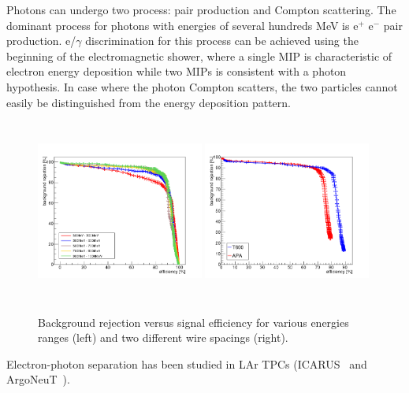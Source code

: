 Photons can undergo two process: pair production and Compton scattering. 
The dominant process for photons with energies of several hundreds MeV is 
e$^+$ e$^-$ pair production.
e/$\gamma$ discrimination
for this process can be achieved using the beginning of the electromagnetic shower, where 
a single MIP is characteristic of electron energy deposition while two MIPs is consistent 
with a photon hypothesis.
In case where the photon Compton scatters, the two particles cannot easily be distinguished
from the energy deposition pattern.


\begin{figure}[h!]
  \centering
\includegraphics[width=0.49\textwidth,height=6.0cm]{figures/eff-bgdrej-diffen}
\includegraphics[width=0.49\textwidth,height=6.0cm]{figures/APAT600_all_norm}
  \caption{Background rejection versus signal efficiency for various energies ranges (left) and two different wire spacings (right).
{\color{red}
}
}
\label{fig:egam}
\end{figure}
Electron-photon separation has been studied in LAr TPCs
(ICARUS~\cite{icarus_eg} and ArgoNeuT~\cite{argoneut_eg}).

